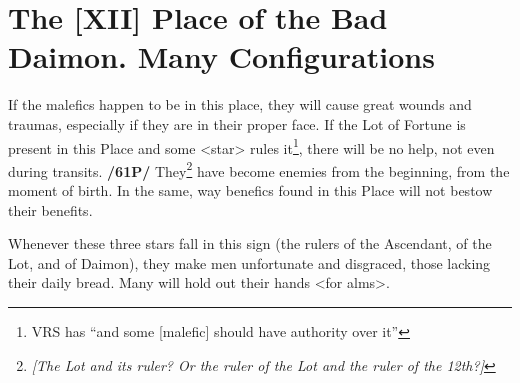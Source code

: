 \section{The [XII] Place of the Bad Daimon. Many Configurations}
If the malefics happen to be in this place, they will cause great wounds and traumas, especially if they are in their proper face. 
If the Lot of Fortune is present in this Place and some <star> rules it\footnote{VRS has ``and some [malefic] should have authority over it''}, there will be no help, not even during transits. \textbf{/61P/} They\footnote{\textit{[The Lot and its ruler? Or the ruler of the Lot and the ruler of the 12th?]}} have become enemies from the beginning, from the moment of birth. In the same, way benefics found in this Place will not bestow their benefits. 

Whenever these three stars fall in this sign (the rulers of the Ascendant, of the Lot, and of Daimon), they make men unfortunate and disgraced, those lacking their daily bread. Many will hold out their hands <for alms>.

\newpage